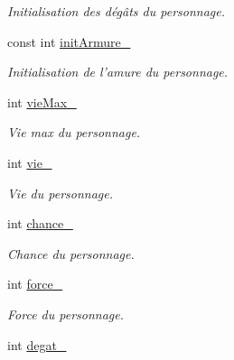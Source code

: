 \begin{DoxyCompactItemize}
\begin{DoxyCompactList}\small\item\em Initialisation des dégâts du personnage. \end{DoxyCompactList}\item 
\hypertarget{class_personnage_a8865af571ab1b0ba6493e855304dbce0}{const int \hyperlink{class_personnage_a8865af571ab1b0ba6493e855304dbce0}{init\-Armure\-\_\-}}\label{class_personnage_a8865af571ab1b0ba6493e855304dbce0}

\begin{DoxyCompactList}\small\item\em Initialisation de l'amure du personnage. \end{DoxyCompactList}\item 
\hypertarget{class_personnage_aca50034f2dfacb9f575e2bc9802ce283}{int \hyperlink{class_personnage_aca50034f2dfacb9f575e2bc9802ce283}{vie\-Max\-\_\-}}\label{class_personnage_aca50034f2dfacb9f575e2bc9802ce283}

\begin{DoxyCompactList}\small\item\em Vie max du personnage. \end{DoxyCompactList}\item 
\hypertarget{class_personnage_ab73c27e86ff1ad20b8702320f7db36e4}{int \hyperlink{class_personnage_ab73c27e86ff1ad20b8702320f7db36e4}{vie\-\_\-}}\label{class_personnage_ab73c27e86ff1ad20b8702320f7db36e4}

\begin{DoxyCompactList}\small\item\em Vie du personnage. \end{DoxyCompactList}\item 
\hypertarget{class_personnage_a383168e6874a1dee5d50fb5c539ccd5e}{int \hyperlink{class_personnage_a383168e6874a1dee5d50fb5c539ccd5e}{chance\-\_\-}}\label{class_personnage_a383168e6874a1dee5d50fb5c539ccd5e}

\begin{DoxyCompactList}\small\item\em Chance du personnage. \end{DoxyCompactList}\item 
\hypertarget{class_personnage_a43cb0829b230d9281adc847fb8218ca7}{int \hyperlink{class_personnage_a43cb0829b230d9281adc847fb8218ca7}{force\-\_\-}}\label{class_personnage_a43cb0829b230d9281adc847fb8218ca7}

\begin{DoxyCompactList}\small\item\em Force du personnage. \end{DoxyCompactList}\item 
\hypertarget{class_personnage_a07cf7fee80e4550e0aeec5f1fce6ae3d}{int \hyperlink{class_personnage_a07cf7fee80e4550e0aeec5f1fce6ae3d}{degat\-\_\-}}\label{class_personnage_a07cf7fee80e4550e0aeec5f1fce6ae3d}


\end{DoxyCompactItemize}
